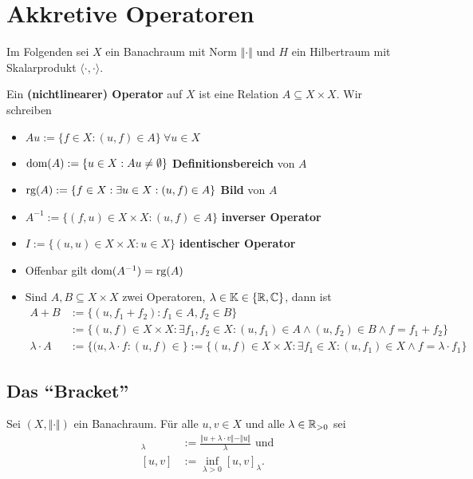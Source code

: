 \chapter{Akkretive Operatoren}
Im Folgenden sei $X$ ein Banachraum mit Norm $\Vert\cdot\Vert$ und $H$ ein Hilbertraum mit Skalarprodukt $\langle\cdot,\cdot\rangle$.

\begin{definition}
Ein \textbf{(nichtlinearer) Operator} auf $X$ ist eine Relation $A\subseteq X\times X$. Wir schreiben
\begin{itemize}
\item $Au:=\lbrace f\in X:(u,f)\in A\rbrace~\forall u\in X$
\item $\text{dom}(A):=\lbrace u\in X:Au\neq\emptyset\rbrace$ \textbf{Definitionsbereich} von $A$
\item $\text{rg}(A):=\lbrace f\in X:\exists u\in X:(u,f)\in A\rbrace$ \textbf{Bild} von $A$
\item $A^{-1}:=\lbrace (f,u)\in X\times X:(u,f)\in A\rbrace$ \textbf{inverser Operator}
\item $I:=\lbrace(u,u)\in X\times X:u\in X\rbrace$ \textbf{identischer Operator}
\item Offenbar gilt $\text{dom}(A^{-1})=\text{rg}(A)$
\item Sind $A,B\subseteq X\times X$ zwei Operatoren, $\lambda\in\mathbb{K}\in\lbrace\mathbb{R},\mathbb{C}\rbrace$, dann ist
\begin{align*}
A+B&:=\lbrace(u,f_1+f_2):f_1\in A,f_2\in B\rbrace\\
&:=\lbrace(u,f)\in X\times X:\exists f_1,f_2\in X:(u,f_1)\in A\wedge(u,f_2)\in B\wedge f=f_1+f_2\rbrace\\
\lambda\cdot A&:=\lbrace(u,\lambda\cdot f:(u,f)\in \rbrace:=\lbrace(u,f)\in X\times X:\exists f_1\in X:(u,f_1)\in X\wedge f=\lambda\cdot f_1\rbrace
\end{align*}
\end{itemize}
\end{definition}

\section{Das ``Bracket''}
Sei $(X,\Vert\cdot\Vert)$ ein Banachraum. Für alle $u,v\in X$ und alle $\lambda\in\mathbb{R}_{>0}$ sei
\begin{align*}
[u,v]_\lambda&:=\frac{\Vert u+\lambda\cdot v\Vert-\Vert u\Vert}{\lambda}\text{ und}\\
[u,v]&:=\inf\limits_{\lambda>0}[u,v]_\lambda.
\end{align*}

